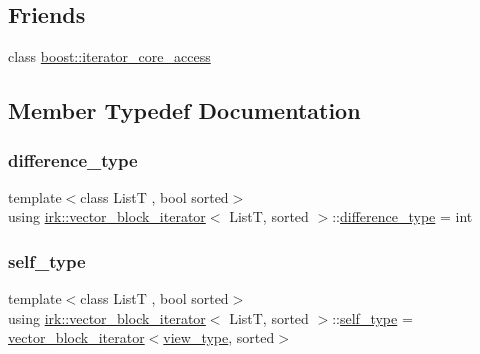 \subsection*{Friends}
\begin{DoxyCompactItemize}
\item 
class \mbox{\hyperlink{classirk_1_1vector__block__iterator_ac09f73e325921cc50ebcd96bed0f8096}{boost\+::iterator\+\_\+core\+\_\+access}}
\end{DoxyCompactItemize}


\subsection{Member Typedef Documentation}
\mbox{\label{classirk_1_1vector__block__iterator_adc4ee937499f8c9ea24a6f99401b4d22}} 
\subsubsection{\texorpdfstring{difference\+\_\+type}{difference\_type}}
{\footnotesize\ttfamily template$<$class ListT , bool sorted$>$ \\
using \mbox{\hyperlink{classirk_1_1vector__block__iterator}{irk\+::vector\+\_\+block\+\_\+iterator}}$<$ ListT, sorted $>$\+::\mbox{\hyperlink{classirk_1_1vector__block__iterator_adc4ee937499f8c9ea24a6f99401b4d22}{difference\+\_\+type}} =  int}

\mbox{\label{classirk_1_1vector__block__iterator_a39e5fae2a4258ea1a7cad14a66be2908}} 
\subsubsection{\texorpdfstring{self\+\_\+type}{self\_type}}
{\footnotesize\ttfamily template$<$class ListT , bool sorted$>$ \\
using \mbox{\hyperlink{classirk_1_1vector__block__iterator}{irk\+::vector\+\_\+block\+\_\+iterator}}$<$ ListT, sorted $>$\+::\mbox{\hyperlink{classirk_1_1vector__block__iterator_a39e5fae2a4258ea1a7cad14a66be2908}{self\+\_\+type}} =  \mbox{\hyperlink{classirk_1_1vector__block__iterator}{vector\+\_\+block\+\_\+iterator}}$<$\mbox{\hyperlink{classirk_1_1vector__block__iterator_aab9b845032870211b56eddcfd9f8cadb}{view\+\_\+type}}, sorted$>$}

